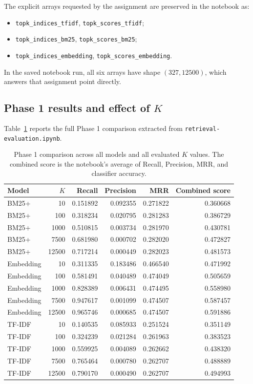 \documentclass[11pt,a4paper]{article}
\begin{document}
The explicit arrays requested by the assignment are preserved in the notebook as:
\begin{itemize}
    \item \texttt{topk\_indices\_tfidf}, \texttt{topk\_scores\_tfidf};
    \item \texttt{topk\_indices\_bm25}, \texttt{topk\_scores\_bm25};
    \item \texttt{topk\_indices\_embedding}, \texttt{topk\_scores\_embedding}.
\end{itemize}

\noindent In the saved notebook run, all six arrays have shape \((327, 12500)\), which answers that assignment point directly.

\subsection{Phase 1 results and effect of \texorpdfstring{$K$}{K}}

Table~\ref{tab:phase1full} reports the full Phase 1 comparison extracted from \texttt{retrieval-evaluation.ipynb}.

\begin{table}[H]
\centering
\scriptsize
\begin{tabular}{l r r r r r}
\toprule
Model & \(K\) & Recall & Precision & MRR & Combined score \\
\midrule
BM25+ & 10 & 0.151892 & 0.092355 & 0.271822 & 0.360668 \\
BM25+ & 100 & 0.318234 & 0.020795 & 0.281283 & 0.386729 \\
BM25+ & 1000 & 0.510815 & 0.003734 & 0.281970 & 0.430781 \\
BM25+ & 7500 & 0.681980 & 0.000702 & 0.282020 & 0.472827 \\
BM25+ & 12500 & 0.717214 & 0.000449 & 0.282023 & 0.481573 \\
\midrule
Embedding & 10 & 0.311335 & 0.183486 & 0.466540 & 0.471992 \\
Embedding & 100 & 0.581491 & 0.040489 & 0.474049 & 0.505659 \\
Embedding & 1000 & 0.828389 & 0.006431 & 0.474495 & 0.558980 \\
Embedding & 7500 & 0.947617 & 0.001099 & 0.474507 & 0.587457 \\
Embedding & 12500 & 0.965746 & 0.000685 & 0.474507 & 0.591886 \\
\midrule
TF-IDF & 10 & 0.140535 & 0.085933 & 0.251524 & 0.351149 \\
TF-IDF & 100 & 0.324239 & 0.021284 & 0.261963 & 0.383523 \\
TF-IDF & 1000 & 0.559925 & 0.004089 & 0.262662 & 0.438320 \\
TF-IDF & 7500 & 0.765464 & 0.000780 & 0.262707 & 0.488889 \\
TF-IDF & 12500 & 0.790170 & 0.000490 & 0.262707 & 0.494993 \\
\bottomrule
\end{tabular}
\caption{Phase 1 comparison across all models and all evaluated \(K\) values. The combined score is the notebook's average of Recall, Precision, MRR, and classifier accuracy.}
\label{tab:phase1full}
\end{table}
\end{document}
